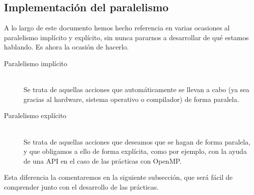 \subsection{Implementación del paralelismo}
A lo largo de este documento hemos hecho referencia en varias ocasiones al paralelismo implícito y explícito, sin nunca pararnos a desarrollar de qué estamos hablando. Es ahora la ocasión de hacerlo.
\begin{description}
    \item [Paralelismo implícito]~\\
        Se trata de aquellas acciones que automáticamente se llevan a cabo (ya sea gracias al hardware, sistema operativo o compilador) de forma paralela.

    \item [Paralelismo explícito]~\\
        Se trata de aquellas acciones que deseamos que se hagan de forma paralela, y que obligamos a ello de forma explícita, como por ejemplo, con la ayuda de una API en el caso de las prácticas con OpenMP.
\end{description}
Esta diferencia la comentaremos en la siguiente subsección, que será fácil de comprender junto con el desarrollo de las prácticas.


